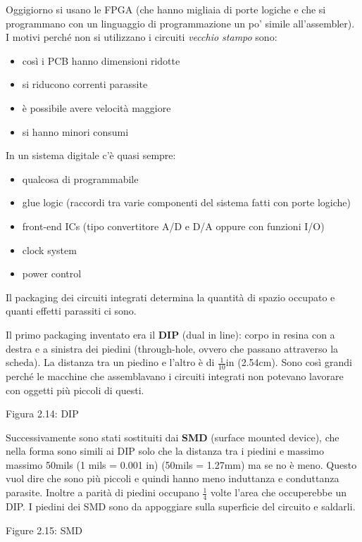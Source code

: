 \documentclass[
]{article}
\providecommand{\tightlist}{%
  \setlength{\itemsep}{0pt}\setlength{\parskip}{0pt}}
\begin{document}
Oggigiorno si usano le FPGA (che hanno migliaia di porte logiche e che
si programmano con un linguaggio di programmazione un po' simile
all'assembler). I motivi perché non si utilizzano i circuiti
\emph{vecchio stampo} sono:

\begin{itemize}
\tightlist
\item
  così i PCB hanno dimensioni ridotte
\item
  si riducono correnti parassite
\item
  è possibile avere velocità maggiore
\item
  si hanno minori consumi
\end{itemize}

In un sistema digitale c'è quasi sempre:

\begin{itemize}
\tightlist
\item
  qualcosa di programmabile
\item
  glue logic (raccordi tra varie componenti del sistema fatti con porte
  logiche)
\item
  front-end ICs (tipo convertitore A/D e D/A oppure con funzioni I/O)
\item
  clock system
\item
  power control
\end{itemize}

Il packaging dei circuiti integrati determina la quantità di spazio
occupato e quanti effetti parassiti ci sono.

Il primo packaging inventato era il \textbf{DIP} (dual in line): corpo
in resina con a destra e a sinistra dei piedini (through-hole, ovvero
che passano attraverso la scheda). La distanza tra un piedino e l'altro
è di \(\frac{1}{10}\)in (2.54cm). Sono così grandi perché le macchine
che assemblavano i circuiti integrati non potevano lavorare con oggetti
più piccoli di questi.

Figura 2.14: DIP

Successivamente sono stati sostituiti dai \textbf{SMD} (surface mounted
device), che nella forma sono simili ai DIP solo che la distanza tra i
piedini e massimo massimo 50mils (1 mils = 0.001 in) (50mils = 1.27mm)
ma se no è meno. Questo vuol dire che sono più piccoli e quindi hanno
meno induttanza e conduttanza parasite. Inoltre a parità di piedini
occupano \(\frac{1}{4}\) volte l'area che occuperebbe un DIP. I piedini
dei SMD sono da appoggiare sulla superficie del circuito e saldarli.

Figure 2.15: SMD
\end{document}
